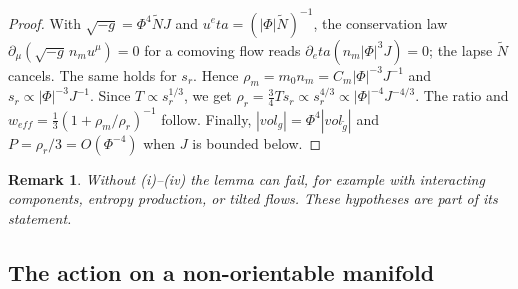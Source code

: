 \documentclass[11pt]{article}
\theoremstyle{canonmath}
\newtheorem{remark}[theorem]{Remark}
\theoremstyle{canonpostulate}
\theoremstyle{canonproposition}
\theoremstyle{canonmath}
\theoremstyle{canonproposition}
\def\mathrm#1{#1}%
\def\eta{eta}%
\begin{document}
\begin{proof}
With $\sqrt{-g} = \Phi^4\tilde NJ$ and $u^\eta = (|\Phi|\tilde N)^{-1}$, the conservation law $\partial_\mu(\sqrt{-g}\,n_mu^\mu) = 0$ for a comoving flow reads $\partial_\eta(n_m|\Phi|^3J) = 0$; the lapse $\tilde N$ cancels. The same holds for $s_r$. Hence $\rho_m = m_0n_m = C_m|\Phi|^{-3}J^{-1}$ and $s_r\propto|\Phi|^{-3}J^{-1}$. Since $T\propto s_r^{1/3}$, we get $\rho_r = \tfrac34Ts_r\propto s_r^{4/3}\propto|\Phi|^{-4}J^{-4/3}$. The ratio and $w_{\mathrm{eff}} = \tfrac13(1+\rho_m/\rho_r)^{-1}$ follow. Finally, $|\mathrm{vol}_g| = \Phi^4|\mathrm{vol}_{\tilde g}|$ and $P = \rho_r/3 = O(\Phi^{-4})$ when $J$ is bounded below.
\end{proof}

\begin{remark}
Without (i)--(iv) the lemma can fail, for example with interacting components, entropy production, or tilted flows. These hypotheses are part of its statement.
\end{remark}

\subsection{The action on a non-orientable manifold}
\end{document}
